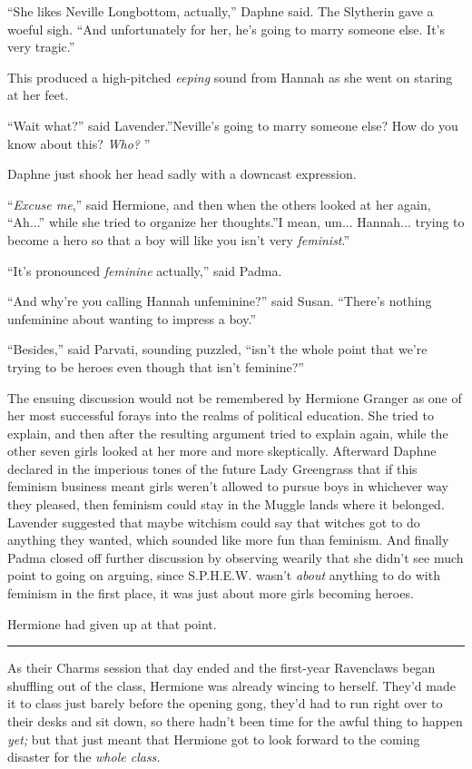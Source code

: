 ``She likes Neville Longbottom, actually,'' Daphne said. The Slytherin
gave a woeful sigh. ``And unfortunately for her, he's going to marry
someone else. It's very tragic.''

This produced a high-pitched \emph{eeping} sound from Hannah as she went
on staring at her feet.

``Wait what?'' said Lavender.''Neville's going to marry someone else?
How do you know about this? \emph{Who?} ''

Daphne just shook her head sadly with a downcast expression.

``\emph{Excuse me},'' said Hermione, and then when the others looked at
her again, ``Ah...'' while she tried to organize her thoughts.''I
mean, um... Hannah... trying to become a hero so that a boy
will like you isn't very \emph{feminist}.''

``It's pronounced \emph{feminine} actually,'' said Padma.

``And why're you calling Hannah unfeminine?'' said Susan. ``There's
nothing unfeminine about wanting to impress a boy.''

``Besides,'' said Parvati, sounding puzzled, ``isn't the whole point
that we're trying to be heroes even though that isn't feminine?''

The ensuing discussion would not be remembered by Hermione Granger as
one of her most successful forays into the realms of political
education. She tried to explain, and then after the resulting argument
tried to explain again, while the other seven girls looked at her more
and more skeptically. Afterward Daphne declared in the imperious tones
of the future Lady Greengrass that if this feminism business meant girls
weren't allowed to pursue boys in whichever way they pleased, then
feminism could stay in the Muggle lands where it belonged. Lavender
suggested that maybe witchism could say that witches got to do anything
they wanted, which sounded like more fun than feminism. And finally
Padma closed off further discussion by observing wearily that she didn't
see much point to going on arguing, since S.P.H.E.W. wasn't \emph{about}
anything to do with feminism in the first place, it was just about more
girls becoming heroes.

Hermione had given up at that point.

\begin{center}\rule{3in}{0.4pt}\end{center}

As their Charms session that day ended and the first-year Ravenclaws
began shuffling out of the class, Hermione was already wincing to
herself. They'd made it to class just barely before the opening gong,
they'd had to run right over to their desks and sit down, so there
hadn't been time for the awful thing to happen \emph{yet;} but that just
meant that Hermione got to look forward to the coming disaster for the
\emph{whole class.}

